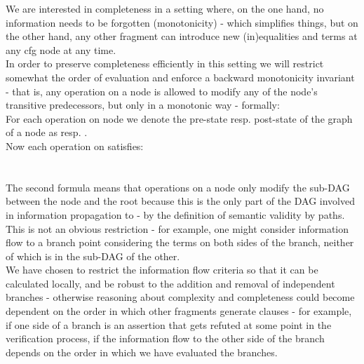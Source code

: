 \begin{itemize}


We are interested in completeness in a setting where, on the one hand, no information needs to be forgotten (monotonicity) - which simplifies things, but on the other hand, any other fragment can introduce new (in)equalities and terms at any cfg node at any time.\\
In order to preserve completeness efficiently in this setting we will restrict somewhat the order of evaluation and enforce a backward monotonicity invariant - that is, any operation on a node is allowed to modify any of the node's transitive predecessors, but only in a monotonic way - formally:\\
For each operation on node  we denote the pre-state resp. post-state of the graph of a node  as 
 resp. . \\
Now each operation on  satisfies:\\
\\
\\
The second formula means that operations on a node  only modify the sub-DAG between the node and the root because this is the only part of the DAG involved in information propagation to  - by the definition of semantic validity by paths.\\
This is not an obvious restriction - for example, one might consider information flow to a branch point considering the terms on both sides of the branch, neither of which is in the sub-DAG of the other. \\
We have chosen to restrict the information flow criteria so that it can be calculated locally, and be robust to the addition and removal of independent branches - otherwise reasoning about complexity and completeness could become dependent on the order in which other fragments generate clauses - for example, if one side of a branch is an assertion that gets refuted at some point in the verification process, if the information flow to the other side of the branch depends on the order in which we have evaluated the branches.




\end{itemize}
